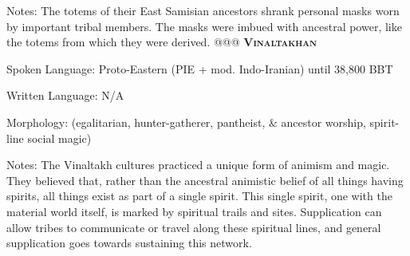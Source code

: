 \documentclass[12pt]{article}
\begin{document}
\begin{easylist}
	{\footnotesize Notes: The totems of their East Samisian ancestors shrank personal masks worn by important tribal members. The masks were imbued with ancestral power, like the totems from which they were derived.}
	@@@ \textsc{\textbf{Vinaltakhan}}
	
	\normalfont Spoken Language: Proto-Eastern (PIE + mod. Indo-Iranian) until 38,800 BBT
	
	Written Language: N/A
	
	Morphology: (egalitarian, hunter-gatherer, pantheist, \& ancestor worship, spirit-line social magic)
	
	{\footnotesize Notes: The Vinaltakh cultures practiced a unique form of animism and magic. They believed that, rather than the ancestral animistic belief of all things having spirits, all things exist as part of a single spirit. This single spirit, one with the material world itself, is marked by spiritual trails and sites. Supplication can allow tribes to communicate or travel along these spiritual lines, and general supplication goes towards sustaining this network.}
\end{easylist}
\end{document}
